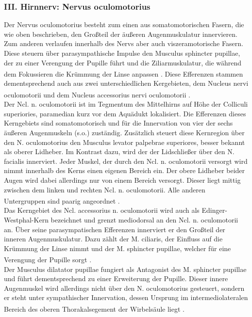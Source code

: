 \documentclass[12pt,a4paper,pdftex]{article}
\begin{document}
\subsubsection*{III. Hirnnerv: Nervus oculomotorius} 
Der Nervus oculomotorius besteht zum einen aus somatomotorischen Fasern, die wie oben beschrieben, den Großteil der äußeren Augenmuskulatur innervieren. Zum anderen verlaufen innerhalb des Nervs aber auch viszeramotorische Fasern. Diese steuern über parasympathische Impulse den Musculus sphincter pupillae, der zu einer Verengung der Pupille führt und die Ziliarmuskulatur, die während dem Fokussieren die Krümmung der Linse anpassen \textsuperscript{\cite[39]{kandel2013principles}}. Diese Efferenzen stammen dementsprechend auch aus zwei unterschiedlichen Kergebieten, dem Nucleus nervi oculomotorii   und dem Nucleus accessorius nervi oculomotorii  \textsuperscript{\cite[5]{trepel2011neuroanatomie}}. \\  
Der Ncl. n. oculomotorii ist im Tegmentum des Mittelhirns auf Höhe der Colliculi superiories, paramedian kurz vor dem Aquädukt lokalisiert. Die Efferenzen dieses Kerngebiets sind somatomotorisch und für die Innervation von vier der sechs äußeren Augenmuskeln (s.o.) zuständig. Zusätzlich steuert diese Kernregion über den N. oculomotorius den Musculus levator palpebrae superiores, besser bekannt als oberer Lidheber. Im Kontrast dazu, wird der der Lidschließer über den N. facialis innerviert. Jeder Muskel, der durch den Ncl. n. oculomotorii versorgt wird nimmt innerhalb des Kerns einen eigenen Bereich ein. Der obere Lidheber beider Augen wird dabei allerdings nur von einem Bereich versorgt. Dieser liegt mittig zwischen dem linken und rechten Ncl. n. oculomotorii. Alle anderen Untergruppen sind paarig angeordnet \textsuperscript{\cite[5]{trepel2011neuroanatomie}}. \\
Das Kerngebiet des Ncl. accessorius n. oculomotorii wird auch als Edinger-Westphal-Kern bezeichnet und grenzt mediodorsal an den Ncl. n. oculomotorii an. Über seine parasympatischen Efferenzen innerviert er den Großteil der inneren Augenmuskulatur. Dazu zählt der M. ciliaris, der Einfluss auf die Krümmung der Linse nimmt und der M. sphincter pupillae, welcher für eine Verengung der Pupille sorgt \textsuperscript{\cite[5]{trepel2011neuroanatomie}}. \\          
Der Musculus dilatator pupillae fungiert als Antagonist des M. sphincter pupillae und führt dementsprechend zu einer Erweiterung der Pupille. Dieser innere Augenmuskel wird allerdings nicht über den N. oculomotorius gesteuert, sondern er steht unter sympathischer Innervation, dessen Ursprung im intermediolateralen Bereich des oberen Thorakalsegement der Wirbelsäule liegt \textsuperscript{\cite[39]{kandel2013principles}}.
\end{document}
